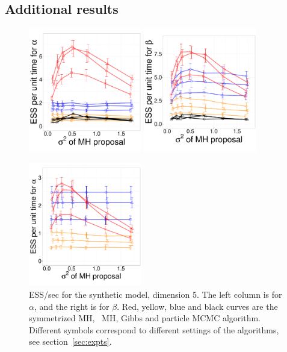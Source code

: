 \subsection{Additional results}
  \begin{figure}[H]
  \centering
  \begin{minipage}[h!]{0.65\linewidth}
  \centering
    \includegraphics [width=0.44\textwidth, angle=0]{figs/exp_5_alpha.pdf}
    \includegraphics [width=0.44\textwidth, angle=0]{figs/exp_5_beta.pdf}
  \end{minipage}
  \begin{minipage}[!hp]{0.33\linewidth}
    \caption{ESS/sec for the synthetic  model, dimension 5. The left column is for $\alpha$, and the 
    right is for $\beta$. Red, yellow, blue and black curves are the symmetrized MH,
  \naive\ MH, Gibbs and particle MCMC algorithm. Different symbols correspond
to different settings of the algorithms, see section~\ref{sec:expts}.}
     \label{fig:ESS_EXP_D5}
  \end{minipage}
  \centering
  \begin{minipage}[hp]{0.65\linewidth}
  \centering
    \includegraphics [width=0.44\textwidth, angle=0]{figs/q_5_alpha.pdf}

\end{minipage}
\end{figure}
